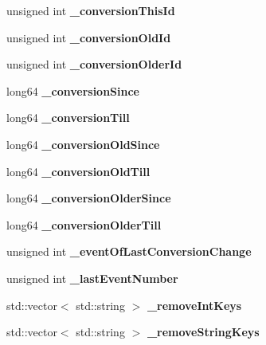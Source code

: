 \begin{DoxyCompactItemize}
\item 
unsigned int {\bfseries \_\-conversionThisId}\label{classTestCondDataProcessor_a3f4afe455b079294200d50a7d06e25ff}

\item 
unsigned int {\bfseries \_\-conversionOldId}\label{classTestCondDataProcessor_abdd4c175f828b67ff078f8072794dd9a}

\item 
unsigned int {\bfseries \_\-conversionOlderId}\label{classTestCondDataProcessor_a55eeec30d100acfa72bb32861b251dd7}

\item 
long64 {\bfseries \_\-conversionSince}\label{classTestCondDataProcessor_ae247e8c77442ae59dbe85769a6e6e913}

\item 
long64 {\bfseries \_\-conversionTill}\label{classTestCondDataProcessor_a1aa7fc8bf8a7ddea31a9cd6c5a408051}

\item 
long64 {\bfseries \_\-conversionOldSince}\label{classTestCondDataProcessor_a934a82f1318df98035c50cdf2c3f8c27}

\item 
long64 {\bfseries \_\-conversionOldTill}\label{classTestCondDataProcessor_a7898024668fd8e6257bc435262dda884}

\item 
long64 {\bfseries \_\-conversionOlderSince}\label{classTestCondDataProcessor_ae930fc00b6884a40cd5b316f681a5879}

\item 
long64 {\bfseries \_\-conversionOlderTill}\label{classTestCondDataProcessor_af3d750a4a4a75defaaffc3de72784696}

\item 
unsigned int {\bfseries \_\-eventOfLastConversionChange}\label{classTestCondDataProcessor_a38a245f1958e98eb1e30b77b00a7da42}

\item 
unsigned int {\bfseries \_\-lastEventNumber}\label{classTestCondDataProcessor_a35e011c605f61bc2d17cfa2b883669ec}

\item 
std::vector$<$ std::string $>$ {\bfseries \_\-removeIntKeys}\label{classTestCondDataProcessor_a00f3686cf22f78880505bbbbbad633f0}

\item 
std::vector$<$ std::string $>$ {\bfseries \_\-removeStringKeys}\label{classTestCondDataProcessor_a9dcf5ad17bcae719fcc7e810610593d1}

\end{DoxyCompactItemize}


